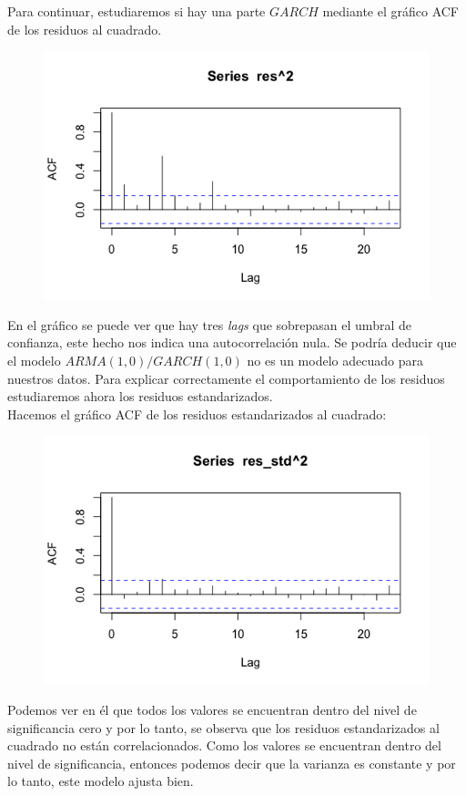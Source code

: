 \documentclass[a4paper,]{article}
\begin{document}
Para continuar, estudiaremos si hay una parte $GARCH$ mediante el gráfico ACF de los residuos al cuadrado.
\begin{figure}[H]
    \centering
\includegraphics[width=0.5\linewidth]{1cacfrees^2.png}   
\end{figure}
En el gráfico se puede ver que hay tres \textit{lags} que sobrepasan el umbral de confianza, este hecho nos indica una autocorrelación nula. Se podría deducir que el modelo $ARMA(1,0)/GARCH(1,0)$ no es un modelo adecuado para nuestros datos. Para explicar correctamente el comportamiento de los residuos estudiaremos ahora los residuos estandarizados.\\

Hacemos el gráfico ACF de los residuos estandarizados al cuadrado:
\begin{figure}[H]
    \centering \includegraphics[width=0.5\linewidth]{resstd^2.png}
\end{figure}
Podemos ver en él que todos los valores se encuentran dentro del nivel de significancia cero y por lo tanto, se observa que los residuos estandarizados al cuadrado no están correlacionados. Como los valores se encuentran dentro del nivel de significancia, entonces podemos decir que la varianza es constante y por lo tanto, este modelo ajusta bien. \\
\end{document}
